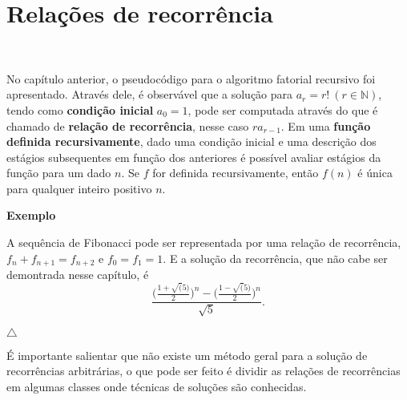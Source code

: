 \section{Relações de recorrência}
\

No capítulo anterior, o pseudocódigo para o algoritmo fatorial recursivo foi apresentado. Através dele, é observável que a solução para $a_r = r! \ (r \in \mathbb{N})$, tendo como \textbf{condição inicial} $a_0 = 1$, pode ser computada através do que é chamado de \textbf{relação de recorrência}, nesse caso $ra_{r-1}$. Em uma \textbf{função definida recursivamente}, dado uma condição inicial e uma descrição dos estágios subsequentes em função dos anteriores é possível avaliar estágios da função para um dado $n$. Se $f$ for definida recursivamente, então $f(n)$ é única para qualquer inteiro positivo $n$.

\textbf{Exemplo}

A sequência de Fibonacci pode ser representada por uma relação de recorrência, $f_{n}+f_{n+1}=f_{n+2}$ e $f_0=f_1=1$. E a solução da recorrência, que não cabe ser demontrada nesse capítulo, é
\[\frac{\Bigr(\frac{1+\sqrt(5)}{2}\Bigr)^n-\Bigr(\frac{1-\sqrt(5)}{2}\Bigr)^n}{\sqrt{5}}.\]

{\raggedleft $\bigtriangleup$ \par}

É importante salientar que não existe um método geral para a solução de recorrências arbitrárias, o que pode ser feito é dividir as relações de recorrências em algumas classes onde técnicas de soluções são conhecidas.